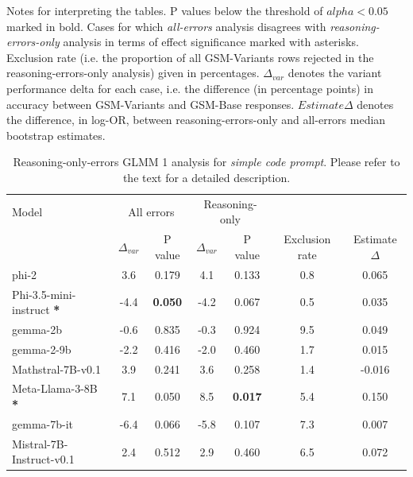 \documentclass[11pt]{article}
\begin{document}
Notes for interpreting the tables. P values below the threshold of $alpha < 0.05$ marked in bold. Cases for which \textit{all-errors} analysis disagrees with \textit{reasoning-errors-only} analysis in terms of effect significance marked with asterisks. Exclusion rate (i.e. the proportion of all GSM-Variants rows rejected in the reasoning-errors-only analysis) given in percentages. $\Delta_{var}$ denotes the variant performance delta for each case, i.e. the difference (in percentage points) in accuracy between GSM-Variants and GSM-Base responses. $Estimate \Delta$ denotes the difference, in log-OR, between reasoning-errors-only and all-errors median bootstrap estimates.

\begin{table}[H]
\small
\centering
\begin{tabular}{l|cc|cc|cc}
\toprule
Model & \multicolumn{2}{c}{All errors} & \multicolumn{2}{c}{Reasoning-only} & \multicolumn{2}{c}{} \\
 & $\Delta_{var}$ & P value & $\Delta_{var}$ & P value & Exclusion rate & Estimate $\Delta$ \\
\midrule
phi-2 & 3.6 & 0.179 & 4.1 & 0.133 & 0.8 & 0.065 \\
Phi-3.5-mini-instruct \textbf{*} & -4.4 & \textbf{0.050} & -4.2 & 0.067 & 0.5 & 0.035 \\
gemma-2b & -0.6 & 0.835 & -0.3 & 0.924 & 9.5 & 0.049 \\
gemma-2-9b & -2.2 & 0.416 & -2.0 & 0.460 & 1.7 & 0.015 \\
Mathstral-7B-v0.1 & 3.9 & 0.241 & 3.6 & 0.258 & 1.4 & -0.016 \\
Meta-Llama-3-8B \textbf{*} & 7.1 & 0.050 & 8.5 & \textbf{0.017} & 5.4 & 0.150 \\
gemma-7b-it & -6.4 & 0.066 & -5.8 & 0.107 & 7.3 & 0.007 \\
Mistral-7B-Instruct-v0.1 & 2.4 & 0.512 & 2.9 & 0.460 & 6.5 & 0.072 \\
\bottomrule
\end{tabular}
\caption{Reasoning-only-errors GLMM 1 analysis for \textit{simple code prompt}. Please refer to the text for a detailed description.}
\label{tab:clean-glmm1-short-code}
\end{table}
\end{document}
